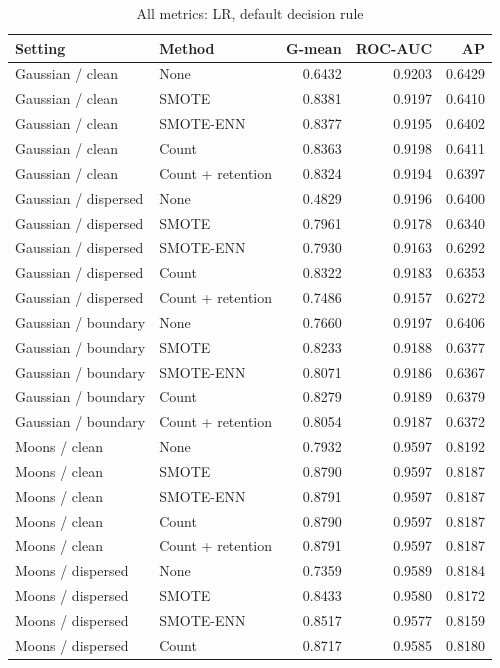 \begin{table}[htbp]
\caption{All metrics: LR, default decision rule}
\centering\small
\begin{tabular}{llrrr}
\hline
Setting & Method & G-mean & ROC-AUC & AP\\
\hline
Gaussian / clean & None & 0.6432 & 0.9203 & 0.6429 \\
Gaussian / clean & SMOTE & 0.8381 & 0.9197 & 0.6410 \\
Gaussian / clean & SMOTE-ENN & 0.8377 & 0.9195 & 0.6402 \\
Gaussian / clean & Count & 0.8363 & 0.9198 & 0.6411 \\
Gaussian / clean & Count + retention & 0.8324 & 0.9194 & 0.6397 \\
Gaussian / dispersed & None & 0.4829 & 0.9196 & 0.6400 \\
Gaussian / dispersed & SMOTE & 0.7961 & 0.9178 & 0.6340 \\
Gaussian / dispersed & SMOTE-ENN & 0.7930 & 0.9163 & 0.6292 \\
Gaussian / dispersed & Count & 0.8322 & 0.9183 & 0.6353 \\
Gaussian / dispersed & Count + retention & 0.7486 & 0.9157 & 0.6272 \\
Gaussian / boundary & None & 0.7660 & 0.9197 & 0.6406 \\
Gaussian / boundary & SMOTE & 0.8233 & 0.9188 & 0.6377 \\
Gaussian / boundary & SMOTE-ENN & 0.8071 & 0.9186 & 0.6367 \\
Gaussian / boundary & Count & 0.8279 & 0.9189 & 0.6379 \\
Gaussian / boundary & Count + retention & 0.8054 & 0.9187 & 0.6372 \\
Moons / clean & None & 0.7932 & 0.9597 & 0.8192 \\
Moons / clean & SMOTE & 0.8790 & 0.9597 & 0.8187 \\
Moons / clean & SMOTE-ENN & 0.8791 & 0.9597 & 0.8187 \\
Moons / clean & Count & 0.8790 & 0.9597 & 0.8187 \\
Moons / clean & Count + retention & 0.8791 & 0.9597 & 0.8187 \\
Moons / dispersed & None & 0.7359 & 0.9589 & 0.8184 \\
Moons / dispersed & SMOTE & 0.8433 & 0.9580 & 0.8172 \\
Moons / dispersed & SMOTE-ENN & 0.8517 & 0.9577 & 0.8159 \\
Moons / dispersed & Count & 0.8717 & 0.9585 & 0.8180 \\

\end{tabular}
\end{table}
